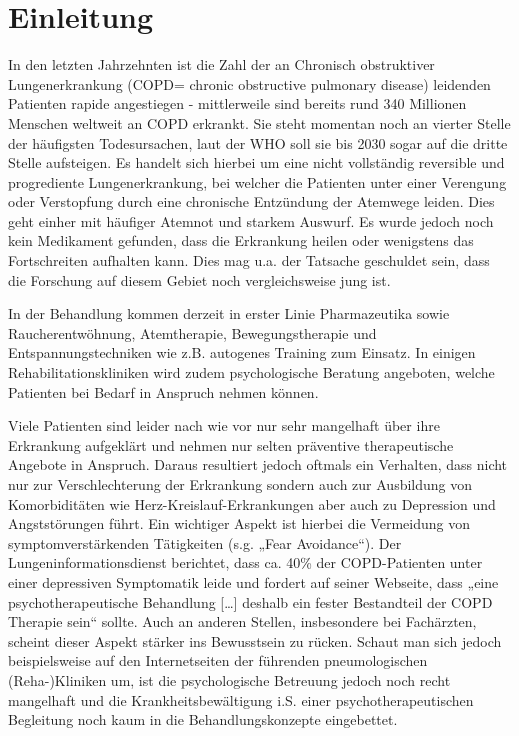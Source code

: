 \chapter{Einleitung}
\ifpdf
    \graphicspath{{1_introduction/figures/PNG/}{1_einleitung/figures/PDF/}{1_einleitung/figures/}}
\else
    \graphicspath{{1_einleitung/figures/EPS/}{1_einleitung/figures/}}
\fi


In den letzten Jahrzehnten ist die Zahl der an Chronisch obstruktiver Lungenerkrankung (COPD= chronic obstructive pulmonary disease) leidenden Patienten rapide angestiegen - mittlerweile sind bereits rund 340 Millionen Menschen weltweit an COPD erkrankt. Sie steht momentan noch an vierter Stelle der häufigsten Todesursachen, laut der WHO soll sie bis 2030 sogar auf die dritte Stelle aufsteigen. Es handelt sich hierbei um eine nicht vollständig reversible und progrediente Lungenerkrankung, bei welcher die Patienten unter einer Verengung oder Verstopfung durch eine chronische Entzündung der Atemwege leiden. Dies geht einher mit häufiger Atemnot und starkem Auswurf.
Es wurde jedoch noch kein Medikament gefunden, dass die Erkrankung heilen oder wenigstens das Fortschreiten aufhalten kann. Dies mag u.a. der Tatsache geschuldet sein, dass die Forschung auf diesem Gebiet noch vergleichsweise jung ist.

In der Behandlung kommen derzeit in erster Linie Pharmazeutika sowie Raucherentwöhnung, Atemtherapie, Bewegungstherapie und Entspannungstechniken wie z.B. autogenes Training zum Einsatz. In einigen Rehabilitationskliniken wird zudem psychologische Beratung angeboten, welche Patienten bei Bedarf in Anspruch nehmen können.

Viele Patienten sind leider nach wie vor nur sehr mangelhaft über ihre Erkrankung aufgeklärt und nehmen nur selten präventive therapeutische Angebote in Anspruch. Daraus resultiert jedoch oftmals ein Verhalten, dass nicht nur zur Verschlechterung der Erkrankung sondern auch zur Ausbildung von Komorbiditäten wie Herz-Kreislauf-Erkrankungen aber auch zu Depression und Angststörungen führt. Ein wichtiger Aspekt ist hierbei die Vermeidung von symptomverstärkenden Tätigkeiten (s.g. „Fear Avoidance“). Der Lungeninformationsdienst  berichtet, dass ca. 40\% der COPD-Patienten unter einer depressiven Symptomatik leide und fordert auf seiner Webseite, dass „eine psychotherapeutische Behandlung […] deshalb ein fester Bestandteil der COPD Therapie sein“ sollte. Auch an anderen Stellen, insbesondere bei Fachärzten, scheint dieser Aspekt stärker ins Bewusstsein zu rücken. Schaut man sich jedoch beispielsweise auf den Internetseiten der führenden pneumologischen (Reha-)Kliniken um, ist die psychologische Betreuung jedoch noch recht mangelhaft und die Krankheitsbewältigung i.S. einer psychotherapeutischen Begleitung noch kaum in die Behandlungskonzepte eingebettet. 

